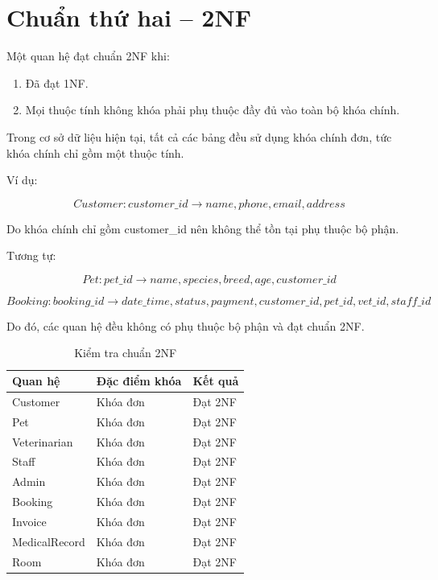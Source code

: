 \section{Chuẩn thứ hai -- 2NF}

Một quan hệ đạt chuẩn 2NF khi:

\begin{enumerate}
    \item Đã đạt 1NF.
    \item Mọi thuộc tính không khóa phải phụ thuộc đầy đủ vào toàn bộ khóa chính.
\end{enumerate}

Trong cơ sở dữ liệu hiện tại, tất cả các bảng đều sử dụng khóa chính đơn, tức khóa chính chỉ gồm một thuộc tính.

Ví dụ:

\[
Customer:
customer\_id \rightarrow name, phone, email, address
\]

Do khóa chính chỉ gồm customer\_id nên không thể tồn tại phụ thuộc bộ phận.

Tương tự:

\[
Pet:
pet\_id \rightarrow name, species, breed, age, customer\_id
\]

\[
Booking:
booking\_id \rightarrow date\_time, status, payment,
customer\_id, pet\_id, vet\_id, staff\_id
\]

Do đó, các quan hệ đều không có phụ thuộc bộ phận và đạt chuẩn 2NF.

\begin{table}[htbp]
    \centering
    \caption{Kiểm tra chuẩn 2NF}
    \label{tab:2nf}
    \begin{tabularx}{\textwidth}{|X|X|X|}
        \hline
        \textbf{Quan hệ} & \textbf{Đặc điểm khóa} & \textbf{Kết quả} \\ \hline
        Customer & Khóa đơn & Đạt 2NF \\ \hline
        Pet & Khóa đơn & Đạt 2NF \\ \hline
        Veterinarian & Khóa đơn & Đạt 2NF \\ \hline
        Staff & Khóa đơn & Đạt 2NF \\ \hline
        Admin & Khóa đơn & Đạt 2NF \\ \hline
        Booking & Khóa đơn & Đạt 2NF \\ \hline
        Invoice & Khóa đơn & Đạt 2NF \\ \hline
        MedicalRecord & Khóa đơn & Đạt 2NF \\ \hline
        Room & Khóa đơn & Đạt 2NF \\ \hline
    \end{tabularx}
\end{table}

